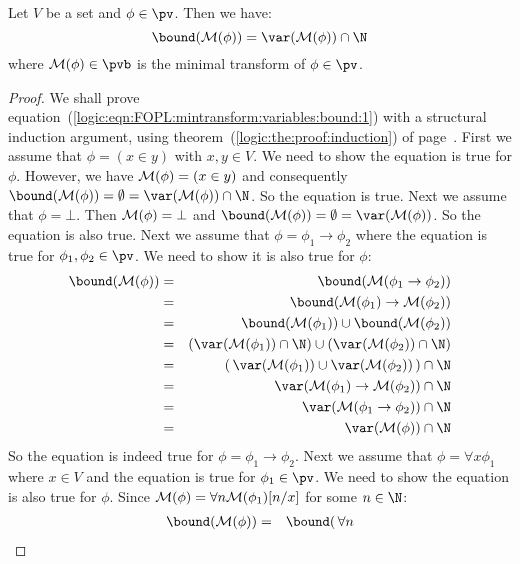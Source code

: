 \begin{prop}\label{logic:prop:FOPL:mintransform:variables:bound}
Let $V$ be a set and $\phi\in\pv$. Then we have:
    \begin{equation}\label{logic:eqn:FOPL:mintransform:variables:bound:1}
    \bound({\cal M}(\phi))=\var({\cal M}(\phi))\cap\N
    \end{equation}
where ${\cal M}(\phi)\in\pvb$ is the minimal transform of
$\phi\in\pv$.
\end{prop}
\begin{proof}
We shall prove
equation~(\ref{logic:eqn:FOPL:mintransform:variables:bound:1}) with
a structural induction argument, using
theorem~(\ref{logic:the:proof:induction}) of
page~\pageref{logic:the:proof:induction}. First we assume that
$\phi=(x\in y)$ with $x,y\in V$. We need to show the equation is
true for $\phi$. However, we have ${\cal M}(\phi)=(x\in y)$ and
consequently $\bound({\cal M}(\phi))=\emptyset=\var({\cal
M}(\phi))\cap\N$. So the equation is true. Next we assume that
$\phi=\bot$. Then ${\cal M}(\phi)=\bot$ and $\bound({\cal
M}(\phi))=\emptyset=\var({\cal M}(\phi))$. So the equation is also
true. Next we assume that $\phi=\phi_{1}\to\phi_{2}$ where the
equation is true for $\phi_{1},\phi_{2}\in\pv$. We need to show it
is also true for $\phi$:
    \begin{eqnarray*}
    \bound({\cal M}(\phi))&=&\bound({\cal M}(\phi_{1}\to\phi_{2}))\\
    &=&\bound({\cal M}(\phi_{1})\to{\cal M}(\phi_{2}))\\
    &=&\bound({\cal M}(\phi_{1}))\cup\bound({\cal M}(\phi_{2}))\\
    &=&(\var({\cal M}(\phi_{1}))\cap\N)\cup(\var({\cal M}(\phi_{2}))\cap\N)\\
    &=&(\,\var({\cal M}(\phi_{1}))\cup\var({\cal M}(\phi_{2}))\,)\cap\N\\
    &=&\var({\cal M}(\phi_{1})\to{\cal M}(\phi_{2}))\cap\N\\
    &=&\var({\cal M}(\phi_{1}\to\phi_{2}))\cap\N\\
    &=&\var({\cal M}(\phi))\cap\N
    \end{eqnarray*}
So the equation is indeed true for $\phi=\phi_{1}\to\phi_{2}$. Next
we assume that $\phi=\forall x\phi_{1}$ where $x\in V$ and the
equation is true for $\phi_{1}\in\pv$. We need to show the equation
is also true for $\phi$. Since ${\cal M}(\phi)=\forall n{\cal
M}(\phi_{1})[n/x]$ for some $n\in\N$:
    \begin{eqnarray*}
    \bound({\cal M}(\phi))&=&\bound(\,\forall n{\cal
}
\end{eqnarray*}
\end{proof}
